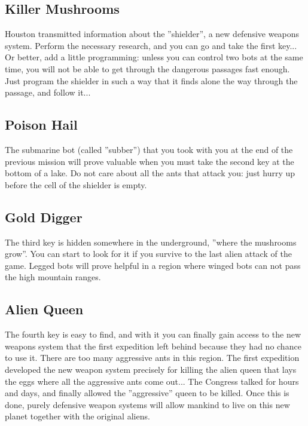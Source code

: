 \subsection{Killer Mushrooms}

Houston transmitted information about the ''shielder'', a new defensive weapons system. Perform the necessary research, and you can go and take the first key... Or better, add a little programming: unless you can control two bots at the same time, you will not be able to get through the dangerous passages fast enough. Just program the shielder in such a way that it finds alone the way through the passage, and follow it...


\subsection{Poison Hail}

The submarine bot (called ''subber'') that you took with you at the end of the previous mission will prove valuable when you must take the second key at the bottom of a lake. Do not care about all the ants that attack you: just hurry up before the cell of the shielder is empty.


\subsection{Gold Digger}

The third key is hidden somewhere in the underground, ''where the mushrooms grow''. You can start to look for it if you survive to the last alien attack of the game. Legged bots will prove helpful in a region where winged bots can not pass the high mountain ranges.


\subsection{Alien Queen}

The fourth key is easy to find, and with it you can finally gain access to the new weapons system that the first expedition left behind because they had no chance to use it. There are too many aggressive ants in this region. The first expedition developed the new weapon system precisely for killing the alien queen that lays the eggs where all the aggressive ants come out... The Congress talked for hours and days, and finally allowed the ''aggressive'' queen to be killed. Once this is done, purely defensive weapon systems will allow mankind to live on this new planet together with the original aliens.
